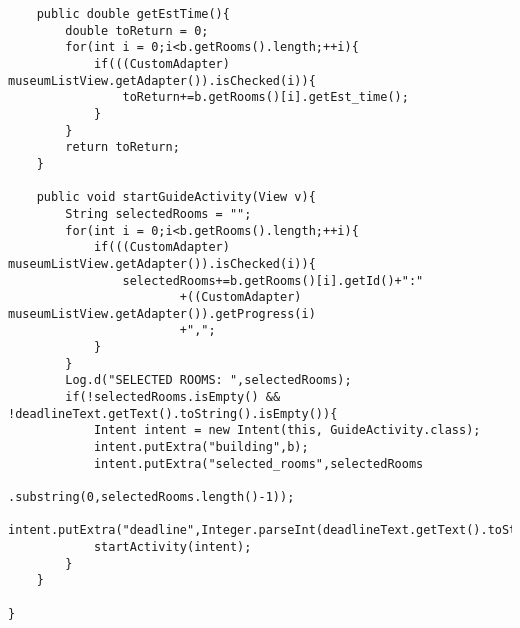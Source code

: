 \begin{lstlisting}
    public double getEstTime(){
        double toReturn = 0;
        for(int i = 0;i<b.getRooms().length;++i){
            if(((CustomAdapter) museumListView.getAdapter()).isChecked(i)){
                toReturn+=b.getRooms()[i].getEst_time();
            }
        }
        return toReturn;
    }

    public void startGuideActivity(View v){
        String selectedRooms = "";
        for(int i = 0;i<b.getRooms().length;++i){
            if(((CustomAdapter) museumListView.getAdapter()).isChecked(i)){
                selectedRooms+=b.getRooms()[i].getId()+":"
                        +((CustomAdapter) museumListView.getAdapter()).getProgress(i)
                        +",";
            }
        }
        Log.d("SELECTED ROOMS: ",selectedRooms);
        if(!selectedRooms.isEmpty() && !deadlineText.getText().toString().isEmpty()){
            Intent intent = new Intent(this, GuideActivity.class);
            intent.putExtra("building",b);
            intent.putExtra("selected_rooms",selectedRooms
                                             .substring(0,selectedRooms.length()-1));
            intent.putExtra("deadline",Integer.parseInt(deadlineText.getText().toString()));
            startActivity(intent);
        }
    }

}
\end{lstlisting}

